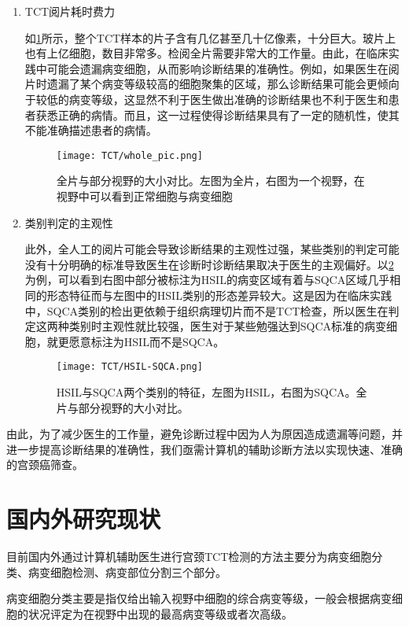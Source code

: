 \begin{enumerate}
    \item TCT阅片耗时费力
          \par 如\ref{全片}所示，整个TCT样本的片子含有几亿甚至几十亿像素，十分巨大。玻片上也有上亿细胞，数目非常多。检阅全片需要非常大的工作量。由此，在临床实践中可能会遗漏病变细胞，从而影响诊断结果的准确性。例如，如果医生在阅片时遗漏了某个病变等级较高的细胞聚集的区域，那么诊断结果可能会更倾向于较低的病变等级，这显然不利于医生做出准确的诊断结果也不利于医生和患者获悉正确的病情。而且，这一过程使得诊断结果具有了一定的随机性，使其不能准确描述患者的病情。

          \begin{figure}[h]
              \centering
              \texttt{[image: TCT/whole\_pic.png]}
              \caption{全片与部分视野的大小对比。左图为全片，右图为一个视野，在视野中可以看到正常细胞与病变细胞}
              \label{全片}
          \end{figure}
    \item 类别判定的主观性
          \par 此外，全人工的阅片可能会导致诊断结果的主观性过强，某些类别的判定可能没有十分明确的标准导致医生在诊断时诊断结果取决于医生的主观偏好。以\ref{HSIL-SQCA}为例，可以看到右图中部分被标注为HSIL的病变区域有着与SQCA区域几乎相同的形态特征而与左图中的HSIL类别的形态差异较大。这是因为在临床实践中，SQCA类别的检出更依赖于组织病理切片而不是TCT检查，所以医生在判定这两种类别时主观性就比较强，医生对于某些勉强达到SQCA标准的病变细胞，就更愿意标注为HSIL而不是SQCA。

          \begin{figure}[h]
              \centering
              \texttt{[image: TCT/HSIL-SQCA.png]}
              \caption{HSIL与SQCA两个类别的特征，左图为HSIL，右图为SQCA。全片与部分视野的大小对比。}
              \label{HSIL-SQCA}
          \end{figure}
\end{enumerate}
\par 由此，为了减少医生的工作量，避免诊断过程中因为人为原因造成遗漏等问题，并进一步提高诊断结果的准确性，我们亟需计算机的辅助诊断方法以实现快速、准确的宫颈癌筛查。

\section{国内外研究现状}
\par 目前国内外通过计算机辅助医生进行宫颈TCT检测的方法主要分为病变细胞分类、病变细胞检测、病变部位分割三个部分。
\par 病变细胞分类主要是指仅给出输入视野中细胞的综合病变等级，一般会根据病变细胞的状况评定为在视野中出现的最高病变等级或者次高级。

